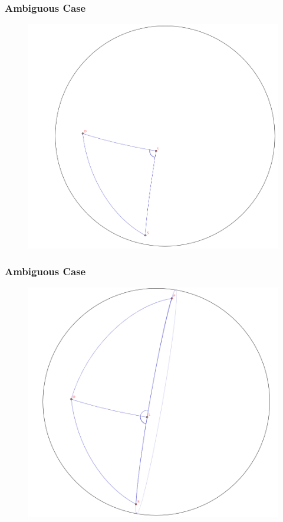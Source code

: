 \documentclass[xcolor=dvipsnames]{beamer}
\begin{document}
\begin{frame}
  \frametitle{Ambiguous Case}
  \begin{figure}[h]
    \includegraphics[scale=.25]{./rightamb.png}
  \end{figure}
\end{frame}

\begin{frame}
  \frametitle{Ambiguous Case}
  \begin{figure}[h]
    \includegraphics[scale=.25]{./rightamb1.png}
  \end{figure}
\end{frame}
\end{document}
